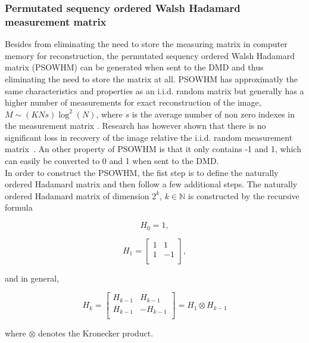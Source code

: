 \subsubsection{Permutated sequency ordered Walsh Hadamard measurement matrix}
\label{sec:SOWHMM}
Besides from eliminating the need to store the measuring matrix in computer memory for reconstruction, the permutated sequency ordered Walsh Hadamard matrix (PSOWHM) can be generated when sent to the DMD and thus eliminating the need to store the matrix at all. PSOWHM has approximatly the same characteristics and properties as an i.i.d. random matrix but generally has a higher number of measurements for exact reconstruction of the image, $M \sim (KNs)\log^2(N)$, where $s$ is the average number of non zero indexes in the measurement matrix \cite{lec:fast_CS_SRM}. Research has however shown that there is no significant loss in recovery of the image relative the i.i.d. random measurement matrix~\cite{article:an_improved_WH_matrix}. An other property of PSOWHM is that it only contains -1 and 1, which can easily be converted to 0 and 1 when sent to the DMD. \\[0.1in]


In order to construct the PSOWHM, the fist step is to define the naturally ordered Hadamard matrix and then follow a few additional steps. The naturally ordered Hadamard matrix of dimension $2^k$, $k \in \mathbb{N}$ is constructed by the recursive formula    

\begin{equation}
    H_0 = 1,
\end{equation}

\begin{equation}
    H_1 = \begin{bmatrix}
       1 & 1 \\
       1 & -1\\
     \end{bmatrix},
\end{equation}

and in general,

\begin{equation}
        H_k = \begin{bmatrix}
       H_{k-1} & H_{k-1} \\
       H_{k-1} & -H_{k-1}\\
       \end{bmatrix} = H_1 \otimes H_{k-1}
\end{equation}

where $\otimes$ denotes the Kronecker product.\\[0.1in]

